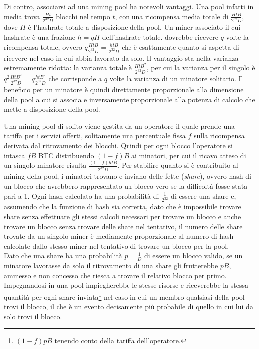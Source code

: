Di contro, associarsi ad una mining pool ha notevoli vantaggi. Una pool infatti in media trova $\frac{Ht}{2^{32}D}$ blocchi nel tempo $t$, con una ricompensa media totale di $\frac{HtB}{2^{32}D}$, dove $H$ è l'hashrate totale a disposizione della pool. Un miner associato il cui hashrate è una frazione $h = qH$ dell'hashrate totale. dovrebbe ricevere $q$ volte la ricompensa totale, ovvero $q\frac{HtB}{2^{32}D} = \frac{htB}{2^{32}D}$ che è esattamente quanto si aspetta di ricevere nel caso in cui abbia lavorato da solo. Il vantaggio sta nella varianza estremamente ridotta: la varianza totale è $\frac{HtB^2}{2^{32}D}$, per cui la varianza per il singolo è $q^2 \frac{HtB^2}{2^{32}D} = q\frac{htB^2}{2^{32}D}$ che corrisponde a $q$ volte la varianza di un minatore solitario. Il beneficio per un minatore è quindi direttamente proporzionale alla dimensione della pool a cui si associa e inversamente proporzionale alla potenza di calcolo che mette a disposizione della pool.

Una mining pool di solito viene gestita da un operatore il quale prende una tariffa per i servizi offerti, solitamente una percentuale fissa $f$ sulla ricompensa derivata dal ritrovamento dei blocchi. Quindi per ogni blocco l'operatore si intasca $fB$ BTC distribuendo $(1-f)B$ ai minatori, per cui il ricavo atteso di un singolo minatore risulta $\frac{(1-f)htB}{2^{32}D}$.
Per stabilire quanto si è contribuito al mining della pool, i minatori trovano e inviano delle fette (\emph{share}), ovvero hash di un blocco che avrebbero rappresentato un blocco vero se la difficoltà fosse stata pari a 1. Ogni hash calcolato ha una probabilità di $\frac{1}{2^32}$ di essere una share e, assumendo che la funzione di hash sia corretta, dato che è impossibile trovare share senza effettuare gli stessi calcoli necessari per trovare un blocco e anche trovare un blocco senza trovare delle share nel tentativo, il numero delle share trovate da un singolo miner è mediamente proporzionale al numero di hash calcolate dallo stesso miner nel tentativo di trovare un blocco per la pool.\\
Dato che una share ha una probabilità $p = \frac{1}{D}$ di essere un blocco valido, se un minatore lavorasse da solo il ritrovamento di una share gli frutterebbe $pB$, ammesso e non concesso che riesca a trovare il relativo blocco per primo. Impegnandosi in una pool impiegherebbe le stesse risorse e riceverebbe la stessa quantità per ogni share inviata\footnote{$(1-f)pB$ tenendo conto della tariffa dell'operatore.} nel caso in cui un membro qualsiasi della pool trovi il blocco, il che è un evento decisamente più probabile di quello in cui lui da solo trovi il blocco.\\

